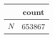 {
\def\sym#1{\ifmmode^{#1}\else\(^{#1}\)\fi}
\begin{tabular}{l*{1}{c}}
\hline\hline
            &       count\\
\hline
\hline
\(N\)       &      653867\\
\hline\hline
\end{tabular}
}
